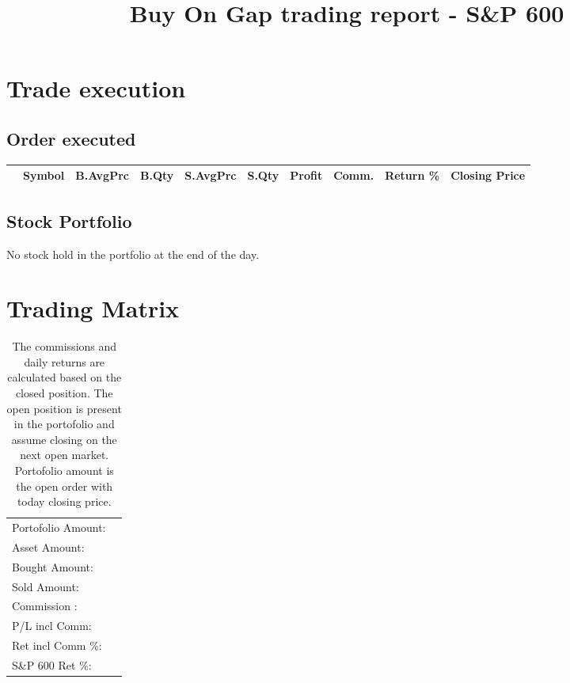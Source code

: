 \documentclass{tufte-handout}\usepackage[]{graphicx}\usepackage[]{color}
\begin{document}
% 
% 


\title{Buy On Gap trading report - S\&P 600}
\maketitle

\section{Trade execution}
\subsection{Order executed}


\begin{table}[ht]
\centering
\begin{tabular}{llrrrrrrr|r}
  \hline
 & Symbol & B.AvgPrc & B.Qty & S.AvgPrc & S.Qty & Profit & Comm. & Return \% & Closing Price \\ 
  \hline
\hline
\end{tabular}
\end{table}



\subsection{Stock Portfolio}
No stock hold in the portfolio at the end of the day.


\section{Trading Matrix}

\begin{table}[ht]
\begin{tabular}{lr}
   \hline
Portofolio Amount: &  \\ 
  Asset Amount: &  \\ 
  Bought Amount: &  \\ 
  Sold   Amount: &  \\ 
  Commission   : &  \\ 
  P/L incl Comm: &  \\ 
  Ret incl Comm \%: &  \\ 
  S\&P 600 Ret \%: &  \\ 
   \hline
\end{tabular}
\caption{The commissions and daily returns are calculated based on the closed position.
The open position is present in the portofolio and assume closing on the next open market.
Portofolio amount is the open order with today closing price.} 
\end{table}
\end{document}

